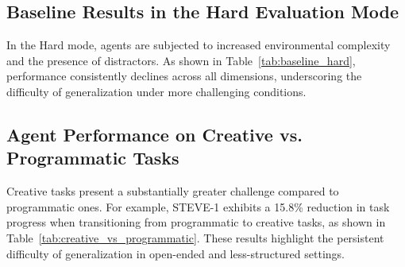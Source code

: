\subsection{Baseline Results in the Hard Evaluation Mode}
In the Hard mode, agents are subjected to increased environmental complexity and the presence of distractors. As shown in Table~\ref{tab:baseline_hard}, performance consistently declines across all dimensions, underscoring the difficulty of generalization under more challenging conditions.

\begin{table}[ht]
\centering
\caption{Performance degradation in hard mode.}
\label{tab:baseline_hard}
\end{table}

\subsection{Agent Performance on Creative vs. Programmatic Tasks}
Creative tasks present a substantially greater challenge compared to programmatic ones. For example, STEVE-1 exhibits a 15.8\% reduction in task progress when transitioning from programmatic to creative tasks, as shown in Table~\ref{tab:creative_vs_programmatic}. These results highlight the persistent difficulty of generalization in open-ended and less-structured settings.

\begin{table}[ht]
\centering
\caption{Performance comparison: creative vs. programmatic tasks.}
\label{tab:creative_vs_programmatic}
\end{table}

